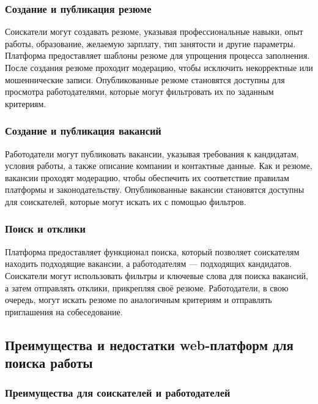\subsubsection{Создание и публикация резюме}

Соискатели могут создавать резюме, указывая профессиональные навыки, опыт работы, образование, желаемую зарплату, тип занятости и другие параметры. Платформа предоставляет шаблоны резюме для упрощения процесса заполнения. После создания резюме проходит модерацию, чтобы исключить некорректные или мошеннические записи. Опубликованные резюме становятся доступны для просмотра работодателями, которые могут фильтровать их по заданным критериям.

\subsubsection{Создание и публикация вакансий}

Работодатели могут публиковать вакансии, указывая требования к кандидатам, условия работы, а также описание компании и контактные данные. Как и резюме, вакансии проходят модерацию, чтобы обеспечить их соответствие правилам платформы и законодательству. Опубликованные вакансии становятся доступны для соискателей, которые могут искать их с помощью фильтров.

\subsubsection{Поиск и отклики}

Платформа предоставляет функционал поиска, который позволяет соискателям находить подходящие вакансии, а работодателям — подходящих кандидатов. Соискатели могут использовать фильтры и ключевые слова для поиска вакансий, а затем отправлять отклики, прикрепляя своё резюме. Работодатели, в свою очередь, могут искать резюме по аналогичным критериям и отправлять приглашения на собеседование.

\subsection{Преимущества и недостатки web-платформ для поиска работы}
\subsubsection{Преимущества для соискателей и работодателей}\

